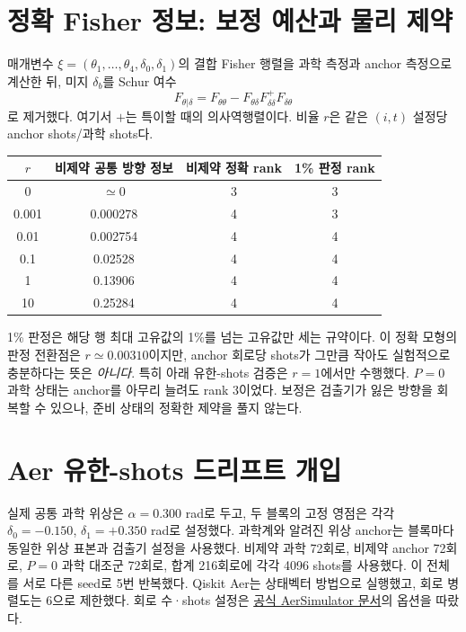 \documentclass[11pt,a4paper]{article}
\begin{document}
\section{정확 Fisher 정보: 보정 예산과 물리 제약}
매개변수 $\xi=(\theta_1,\ldots,\theta_4,\delta_0,\delta_1)$의
결합 Fisher 행렬을 과학 측정과 anchor 측정으로 계산한 뒤,
미지 $\delta_b$를 Schur 여수
\begin{equation}
 F_{\theta|\delta}=F_{\theta\theta}-
 F_{\theta\delta}F_{\delta\delta}^{+}F_{\delta\theta}
\end{equation}
로 제거했다. 여기서 $+$는 특이할 때의 의사역행렬이다.
비율 $r$은 같은 $(i,t)$ 설정당 anchor shots/과학 shots다.
\begin{center}
\begin{tabular}{@{}cccc@{}}
\toprule
$r$ & 비제약 공통 방향 정보 & 비제약 정확 rank & 1\% 판정 rank \\
\midrule
0 & $\simeq0$ & 3 & 3 \\
0.001 & 0.000278 & 4 & 3 \\
0.01 & 0.002754 & 4 & 4 \\
0.1 & 0.02528 & 4 & 4 \\
1 & 0.13906 & 4 & 4 \\
10 & 0.25284 & 4 & 4 \\
\bottomrule
\end{tabular}
\end{center}
1\% 판정은 해당 행 최대 고유값의 1\%를 넘는 고유값만
세는 규약이다. 이 정확 모형의 판정 전환점은
$r\simeq0.00310$이지만, anchor 회로당 shots가 그만큼
작아도 실험적으로 충분하다는 뜻은 \emph{아니다}. 특히 아래
유한-shots 검증은 $r=1$에서만 수행했다. $P=0$ 과학 상태는
anchor를 아무리 늘려도 rank 3이었다. 보정은 검출기가 잃은
방향을 회복할 수 있으나, 준비 상태의 정확한 제약을 풀지 않는다.

\section{Aer 유한-shots 드리프트 개입}
실제 공통 과학 위상은 $\alpha=0.300$ rad로 두고,
두 블록의 고정 영점은 각각
$\delta_0=-0.150$, $\delta_1=+0.350$ rad로 설정했다.
과학계와 알려진 위상 anchor는 블록마다 동일한 위상 표본과
검출기 설정을 사용했다. 비제약 과학 72회로, 비제약 anchor
72회로, $P=0$ 과학 대조군 72회로, 합계 216회로에
각각 4096 shots를 사용했다. 이 전체를 서로 다른 seed로
5번 반복했다. Qiskit Aer는 상태벡터 방법으로 실행했고,
회로 병렬도는 6으로 제한했다. 회로 수·shots 설정은
\href{https://qiskit.github.io/qiskit-aer/stubs/qiskit_aer.AerSimulator.html}{공식 AerSimulator 문서}의
옵션을 따랐다.
\end{document}
